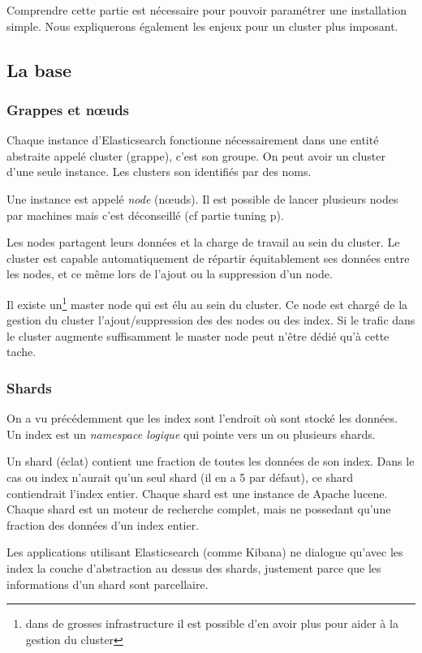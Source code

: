 {Comprendre cette partie est nécessaire pour pouvoir paramétrer une installation simple.
Nous expliquerons également les enjeux pour un cluster plus imposant.
\subsection{La base}
\label{subsec:labase}
\subsubsection{Grappes et nœuds}
Chaque instance d'Elasticsearch fonctionne nécessairement dans une entité abstraite 
appelé cluster (grappe), c'est son groupe. On peut avoir un cluster d'une seule instance.
Les clusters son identifiés par des noms.

Une instance est appelé \emph{node} (nœuds). Il est possible de lancer plusieurs nodes  
par machines mais c'est déconseillé (cf partie tuning p\pageref{subsec:elastictuning}).

Les nodes partagent leurs données et la charge de travail au sein du cluster. Le 
cluster est capable automatiquement de répartir équitablement ses données entre 
les nodes, et ce même lors de l'ajout ou la suppression d'un node.

Il existe un\footnote{dans de grosses infrastructure il est possible d'en avoir plus
pour aider à la gestion du cluster} master node qui est élu au sein du cluster. 
Ce node est chargé de la gestion du cluster l'ajout/suppression des des nodes ou des  
index. Si le trafic dans le cluster augmente suffisamment le master node peut n'être 
dédié qu'à cette tache.

\subsubsection{Shards}
On a vu précédemment que les index sont l'endroit où sont stocké les données. Un 
index est un \textit{namespace logique} qui pointe vers un ou plusieurs shards.

Un shard (éclat) contient une fraction de toutes les données de  son index. Dans 
le cas ou index n'aurait qu'un seul shard (il en a 5 par défaut), ce shard contiendrait
l'index entier.
Chaque shard est une instance de Apache lucene. Chaque shard est un moteur de recherche
complet, mais ne possedant qu'une fraction des données d'un index entier.

Les applications utilisant Elasticsearch (comme Kibana) ne dialogue qu'avec les index
la couche d'abstraction au dessus des shards, justement parce que les informations 
d'un shard sont parcellaire.

}
